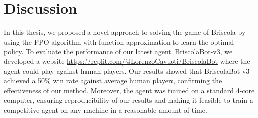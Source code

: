 \chapter{Discussion}
In this thesis, we proposed a novel approach to solving the game of Briscola by using the PPO algorithm with function approximation to learn the optimal policy. To evaluate the performance of our latest agent, BriscolaBot-v3, we developed a website \url{https://replit.com/@LorenzoCavuoti/BriscolaBot} where the agent could play against human players. Our results showed that BriscolaBot-v3 achieved a 50\% win rate against average human players, confirming the effectiveness of our method. Moreover, the agent was trained on a standard 4-core computer, ensuring reproducibility of our results and making it feasible to train a competitive agent on any machine in a reasonable amount of time.

